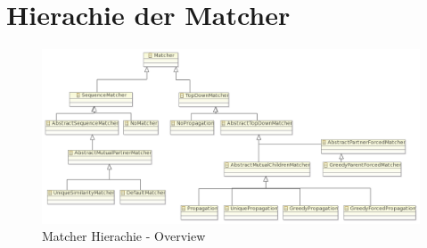 \documentclass{article}
\begin{document}
\section{Hierachie der Matcher}
\begin{center}
\begin{figure}[htb!]
  \centering
       \includegraphics[width=\textwidth]{pics/matcher.png}
  \caption{Matcher Hierachie - Overview}
  \label{fig:overview}
\end{figure}
\end{center}
\end{document}

